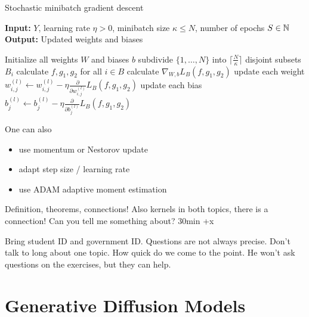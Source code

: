 \begin{algorithm}[H] %
    \caption{Stochastic minibatch gradient descent}\label{alg:sbgd}
 \textbf{Input:}  $Y$, learning rate $\eta>0$, minibatch size $\kappa\leq N$, number of epochs $S\in \mathbb{N}$\\
 \textbf{Output:} Updated weights and biases
 \begin{algorithmic}
    \State Initialize all weights $W$ and biases $b$
        \State subdivide $\{1,\dots,N\}$ into $\lceil \frac{N}{\kappa}\rceil$ disjoint subsets $B_i$
        \State calculate $f,g_1,g_2$ for all $i\in B$
        \State calculate $\nabla_{W,b} L_B(f,g_1,g_2)$
        \State update each weight $w_{i,j}^{(l)}\leftarrow w_{i,j}^{(l)}-\eta\frac{\partial}{\partial w_{i,j}^{(l)}}L_B(f,g_1,g_2)$
        \State update each bias $b_{j}^{(l)}\leftarrow b_{j}^{(l)}-\eta\frac{\partial}{\partial b_{j}^{(l)}}L_B(f,g_1,g_2)$
        \EndFor
    \EndFor
 \end{algorithmic}
\end{algorithm}

One can also 
\begin{itemize}
    \item use momentum or Nestorov update
    \item adapt step size / learning rate
    \item use ADAM adaptive moment estimation
\end{itemize}

\begin{aremark}
    Definition, theorems, connections! Also kernels in both topics, there is a connection! Can you tell me something about? 30min +x 

    Bring student ID and government ID. Questions are not always precise. Don't talk to long about one topic. How quick do we come to the point. He won't ask questions on the exercises, but they can help.

\end{aremark}

\section{Generative Diffusion Models}

